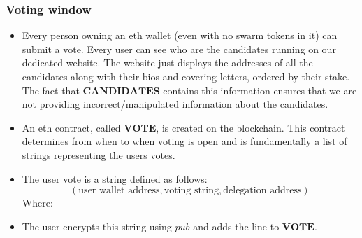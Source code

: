 \documentclass[submission, copyright,creativecommons,sharealike,noncommercial]{eptcs}
\begin{document}
		\subsubsection{Voting window}
			\begin{itemize}
				\item Every person owning an eth wallet (even with no swarm tokens in it) can submit a vote. Every user can see who are the candidates running on our dedicated website. The website just displays the addresses of all the candidates along with their bios and covering letters, ordered by their stake. The fact that $\textbf{CANDIDATES}$ contains this information ensures that we are not providing incorrect/manipulated information about the candidates.
				
				\item An eth contract, called $\textbf{VOTE}$, is created on the blockchain. This contract determines from when to when voting is open and is fundamentally a list of strings representing the users votes.
				
				\item The user vote is a string defined as follows: 
				\[
				(\text{user wallet address}, \text{voting string}, \text{delegation address})
				\]
				Where:
			
				\item The user encrypts this string using $pub$ and adds the line to $\textbf{VOTE}$.
			\end{itemize}
		
\end{document}
